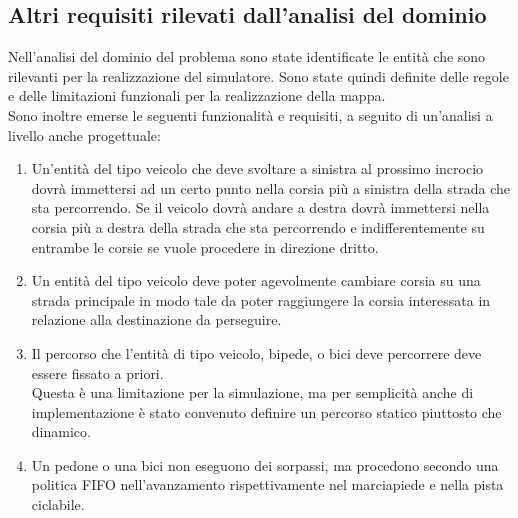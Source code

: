 \subsection{Altri requisiti rilevati dall'analisi del dominio}
Nell'analisi del dominio del problema sono state identificate le entità
che sono rilevanti per la realizzazione del simulatore. Sono state quindi
definite delle regole e delle limitazioni funzionali per la realizzazione della
mappa. \\
Sono inoltre emerse le seguenti funzionalità e requisiti, a seguito di
un'analisi a livello anche progettuale:
\begin{enumerate}
\item Un'entità del tipo veicolo che deve svoltare a sinistra al prossimo
incrocio dovrà immettersi ad un certo punto nella corsia più a sinistra della
strada che sta percorrendo. Se il veicolo dovrà andare a destra dovrà
immettersi nella corsia più a destra della strada che sta percorrendo e
indifferentemente su entrambe le corsie se vuole procedere in direzione dritto.
\item Un entità del tipo veicolo deve poter agevolmente cambiare corsia su una
strada principale in modo tale da poter raggiungere la corsia interessata in
relazione alla destinazione da perseguire.
\item Il percorso che l'entità di tipo veicolo, bipede, o bici deve percorrere
deve essere fissato a priori. \\
Questa è una limitazione per la simulazione, ma per semplicità anche di
implementazione è stato convenuto definire un percorso statico piuttosto che
dinamico.
\item Un pedone o una bici non eseguono dei sorpassi, ma procedono secondo una
politica \ac{FIFO} nell'avanzamento rispettivamente nel marciapiede e nella
pista ciclabile.
\end{enumerate}

\newpage

